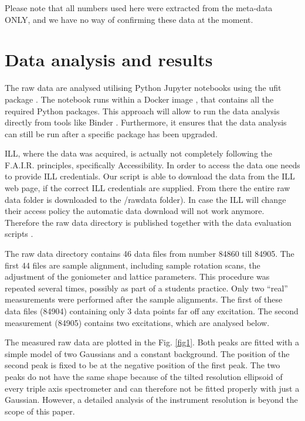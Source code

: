 \documentclass[aps,reprint,amsmath,amssymb,superscriptaddress]{revtex4-1}
\begin{document}
Please note that all numbers used here were extracted from the meta-data ONLY, and we have no way of confirming these data at the moment. 


\section{Data analysis and results}

The raw data are analysed utilising Python Jupyter notebooks \cite{jupyter} using the ufit package \cite{ufit}.
The notebook \cite{data-evaluation} runs within a Docker image \cite{Docker}, that contains all the required Python packages.
This approach will allow to run the data analysis \cite{data-docker} directly from tools like Binder \cite{binder}.
Furthermore, it ensures that the data analysis can still be run after a specific package has been upgraded.

ILL, where the data was acquired, is actually not completely following the F.A.I.R. principles, specifically Accessibility. 
In order to access the data one needs to provide ILL credentials. 
Our script is able to download the data from the ILL web page, if the correct ILL credentials are supplied. 
From there the entire raw data folder is downloaded to the /rawdata folder). 
In case the ILL will change their access policy the automatic data download will not work anymore. 
Therefore the raw data directory is published together with the data evaluation scripts \cite{data-evaluation}.

The raw data directory contains 46 data files from number 84860 till 84905. 
The first 44 files are sample alignment, including sample rotation scans, the adjustment of the goniometer and lattice parameters. 
This procedure was repeated several times, possibly as part of a students practice.
Only two ``real'' measurements were performed after the sample alignments.
The first of these data files (84904) containing only 3 data points far off any excitation.
The second measurement (84905) contains two excitations, which are analysed below.

The measured raw data are plotted in the Fig. \ref{fig1}.
Both peaks are fitted with a simple model of two Gaussians and a constant background. 
The position of the second peak is fixed to be at the negative position of the first peak. 
The two peaks do not have the same shape because of the tilted resolution ellipsoid of every triple axis spectrometer and can therefore not be fitted properly with just a Gaussian. 
However, a detailed analysis of the instrument resolution is beyond the scope of this paper.
\end{document}
